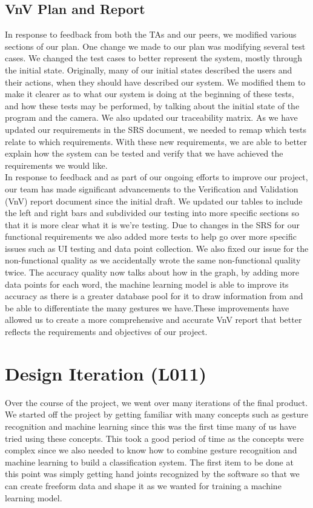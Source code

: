 \documentclass[12pt, titlepage]{article}
\begin{document}
\subsection{VnV Plan and Report}
In response to feedback from both the TAs and our peers, we modified various sections of our plan. One change we made to our plan was modifying several test cases. We changed the test cases to better represent the system, mostly through the initial state. Originally, many of our initial states described the users and their actions, when they should have described our system. We modified them to make it clearer as to what our system is doing at the beginning of these tests, and how these tests may be performed, by talking about the initial state of the program and the camera. We also updated our traceability matrix. As we have updated our requirements in the SRS document, we needed to remap which tests relate to which requirements. With these new requirements, we are able to better explain how the system can be tested and verify that we have achieved the requirements we would like.\\

\noindent In response to feedback and as part of our ongoing efforts to improve our project, our team has made significant advancements to the Verification and Validation (VnV) report document since the initial draft. We updated our tables to include the left and right bars and subdivided our testing into more specific sections so that it is more clear what it is we’re testing. Due to changes in the SRS for our functional requirements we also added more tests to help go over more specific issues such as UI testing and data point collection. We also fixed our issue for the non-functional quality as we accidentally wrote the same non-functional quality twice. The accuracy quality now talks about how in the graph, by adding more data points for each word, the machine learning model is able to improve its accuracy as there is a greater database pool for it to draw information from and be able to differentiate the many gestures we have.These improvements have allowed us to create a more comprehensive and accurate VnV report that better reflects the requirements and objectives of our project.\\

\section{Design Iteration (L011)}

Over the course of the project, we went over many iterations of the final product. We started off the project by getting familiar with many concepts such as gesture recognition and machine learning since this was the first time many of us have tried using these concepts. This took a good period of time as the concepts were complex since we also needed to know how to combine gesture recognition and machine learning to build a classification system. The first item to be done at this point was simply getting hand joints recognized by the software so that we can create freeform data and shape it as we wanted for training a machine learning model.\\
\end{document}
